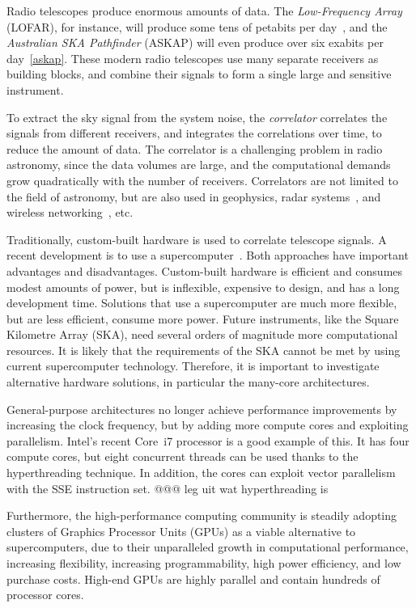 \documentclass{article}
\begin{document}
Radio telescopes produce enormous amounts of data.
The \emph{Low-Frequency Array\/} (LOFAR), for instance, will produce some tens
of petabits per day~\cite{Butcher:04}, and the \emph{Australian SKA Pathfinder\/} (ASKAP) will
even produce over six exabits per day~\ref{askap}.
These modern radio telescopes use many separate receivers as building blocks,
and combine their signals to form a single large and sensitive instrument.

To extract the sky signal from the system noise, the \emph{correlator\/}
correlates the signals from different receivers, and integrates the
correlations over time, to reduce the amount of data.
The correlator is a challenging problem in radio astronomy,
since the data volumes are large, and the computational demands grow
quadratically with the number of receivers.
Correlators are not limited to the field of astronomy, but are also used 
in geophysics\cite{correlator-geophysics},
radar systems~\cite{correlator-radar}, and
wireless networking~\cite{correlator-wireless}, etc.

Traditionally, custom-built hardware is used to correlate telescope signals.
A recent development is to use a supercomputer~\cite{Romein:06}.
Both approaches have important advantages and disadvantages.
Custom-built hardware is efficient and consumes modest amounts of power, but is
inflexible, expensive to design, and has a long development time.
Solutions that use a supercomputer are much more flexible, but are less
efficient, consume more power.%
Future instruments, like the Square Kilometre Array (SKA), need several orders
of magnitude more computational resources.
It is likely that the requirements of the SKA cannot be met by using
current supercomputer technology. Therefore, it is important to investigate
alternative hardware solutions, in particular the many-core architectures.

General-purpose architectures no longer
achieve performance improvements by increasing the clock frequency, but
by adding more compute cores and exploiting parallelism.  Intel's
recent Core~i7 processor is a good example of this. It has four
compute cores, but eight concurrent threads can be used thanks to the
hyperthreading technique. In addition, the cores can exploit vector
parallelism with the SSE instruction set.
@@@ leg uit wat hyperthreading is

Furthermore, the high-performance computing community is
steadily adopting clusters of Graphics Processor Units (GPUs) as a viable
alternative to supercomputers, due to their unparalleled growth in
computational performance, increasing flexibility, increasing programmability,
high power efficiency, and low purchase costs.
High-end GPUs are highly parallel and contain hundreds of processor cores.
\end{document}

